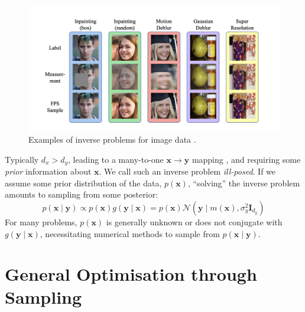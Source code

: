\begin{figure}[htbp]
    \centering
    \includegraphics[width=1\textwidth]{assets/inverse_problems.png}
    \caption{Examples of inverse problems for image data \parencite{douDiffusionPosteriorSampling2023}.}
    \label{fig:inverse-problems}
\end{figure}

\begin{remark} \label{rem:bayes-inv}
    Typically $d_x > d_y$, leading to a many-to-one $\mathbf{x} \rightarrow \mathbf{y}$ mapping
    \parencite{chungDiffusionPosteriorSampling2022}, and requiring some \emph{prior} information
    about $\mathbf{x}$. We call such an inverse problem \emph{ill-posed}. If we assume some prior
    distribution of the data, $p(\mathbf{x})$, ``solving'' the inverse problem amounts to sampling
    from some posterior:
    \begin{equation*}
        p(\mathbf{x} \mid \mathbf{y}) \propto p(\mathbf{x})g(\mathbf{y} \mid \mathbf{x})
        = p(\mathbf{x})\mathcal{N}\left(\mathbf{y} \mid m(\mathbf{x}), \sigma^2_y\mathbf{I}_{d_y}\right)
    \end{equation*}
    For many problems, $p(\mathbf{x})$ is generally unknown or does not conjugate with
    $g(\mathbf{y} \mid \mathbf{x})$, necessitating numerical methods to sample from
    $p(\mathbf{x} \mid \mathbf{y})$.
\end{remark}

\section{General Optimisation through Sampling}\label{sec:general-optimisation}

